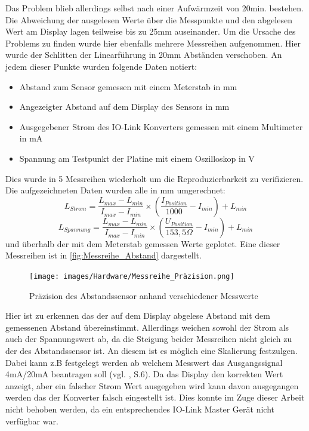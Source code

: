 Das Problem blieb allerdings selbst nach einer Aufwärmzeit von 20min. bestehen. Die Abweichung der ausgelesen Werte über die Messpunkte und den abgelesen Wert am Display lagen teilweise bis zu 25mm auseinander. Um die Ursache des Problems zu finden wurde hier ebenfalls mehrere Messreihen aufgenommen. Hier wurde der Schlitten der Linearführung in 20mm Abständen verschoben. An jedem dieser Punkte wurden folgende Daten notiert:
\begin{itemize}
	\item Abstand zum Sensor gemessen mit einem Meterstab in mm
	\item Angezeigter Abstand auf dem Display des Sensors in mm
	\item Ausgegebener Strom des IO-Link Konverters gemessen mit einem Multimeter in mA
	\item Spannung am Testpunkt der Platine mit einem Oszilloskop in V
\end{itemize}
Dies wurde in 5 Messreihen wiederholt um die Reproduzierbarkeit zu verifizieren. Die aufgezeichneten Daten wurden alle in mm umgerechnet:
\begin{equation}
	L_{Strom} = \frac{L_{max}-L_{min}}{I_{max}-I_{min}}\times(\frac{I_{Position}}{1000}-I_{min}) + L_{min}
\end{equation}
\begin{equation}
	L_{Spannung} = \frac{L_{max}-L_{min}}{I_{max}-I_{min}}\times(\frac{U_{Position}}{153,5\Omega}-I_{min}) + L_{min}
\end{equation}
 und überhalb der mit dem Meterstab gemessen Werte geplotet. Eine dieser Messreihen ist in \autoref{fig:Messreihe_Abstand} dargestellt.
\begin{figure}[H]
	\centering
	\texttt{[image: images/Hardware/Messreihe\_Präzision.png]}
	\caption{Präzision des Abstandssensor anhand verschiedener Messwerte}
	\label{fig:Messreihe_Abstand}
\end{figure}
\noindent Hier ist zu erkennen das der auf dem Display abgelese Abstand mit dem gemessenen Abstand übereinstimmt. Allerdings weichen sowohl der Strom als auch der Spannungswert ab, da die Steigung beider Messreihen nicht gleich zu der des Abstandssensor ist. An diesem ist es möglich eine Skalierung festzulgen. Dabei kann z.B festgelegt werden ab welchem Messwert das Ausgangssignal 4mA/20mA beantragen soll (vgl. \cite{EIO104_Manual}, S.6). Da das Display den korrekten Wert anzeigt, aber ein falscher Strom Wert ausgegeben wird kann davon ausgegangen werden das der Konverter falsch eingestellt ist. Dies konnte im Zuge dieser Arbeit nicht behoben werden, da ein entsprechendes IO-Link Master Gerät nicht verfügbar war.
